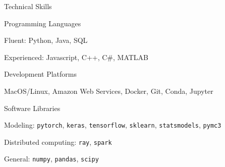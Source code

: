 \documentclass{resume} %
\begin{document}
\begin{rSection}{Technical Skills}

\begin{rSubsection}{Programming Languages}{}{}{}
	\item Fluent: Python, Java, SQL
	\item Experienced: Javascript, C++, C\#, MATLAB
\end{rSubsection}
\begin{rSubsection}{Development Platforms}{}{}{}
	\item MacOS/Linux, Amazon Web Services, Docker, Git, Conda, Jupyter
\end{rSubsection}
\begin{rSubsection}{Software Libraries}{}{}{}
	\item Modeling: \texttt{pytorch}, \texttt{keras}, \texttt{tensorflow}, \texttt{sklearn}, \texttt{statsmodels}, \texttt{pymc3}
	\item Distributed computing: \texttt{ray}, \texttt{spark}
	\item General: \texttt{numpy}, \texttt{pandas}, \texttt{scipy}
\end{rSubsection}

\end{rSection}

\end{document}
